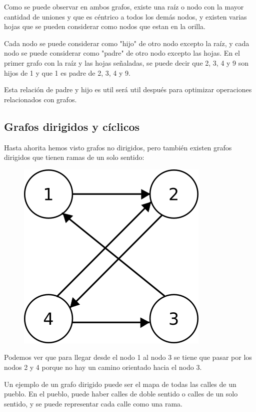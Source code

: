 \documentclass{article}
\begin{document}
Como se puede observar en ambos grafos, existe una raíz o nodo con la mayor cantidad de uniones y que es céntrico a todos los demás nodos, y existen varias hojas que se pueden considerar como nodos que estan en la orilla.

Cada nodo se puede considerar como "hijo" de otro nodo excepto la raíz, y cada nodo se puede considerar como "padre" de otro nodo excepto las hojas. En el primer grafo con la raíz y las hojas señaladas, se puede decir que 2, 3, 4 y 9 son hijos de 1 y que 1 es padre de 2, 3, 4 y 9.

Esta relación de padre y hijo es util será util después para optimizar operaciones relacionados con grafos.

\subsection{Grafos dirigidos y cíclicos}

Hasta ahorita hemos visto grafos no dirigidos, pero también existen grafos dirigidos que tienen ramas de un solo sentido:

\begin{figure}[H]
    \centering
    \includegraphics[width=0.15\paperwidth]{dirigido}
\end{figure}

Podemos ver que para llegar desde el nodo 1 al nodo 3 se tiene que pasar por los nodos 2 y 4 porque no hay un camino orientado hacia el nodo 3.

Un ejemplo de un grafo dirigido puede ser el mapa de todas las calles de un pueblo. En el pueblo, puede haber calles de doble sentido o calles de un solo sentido, y se puede representar cada calle como una rama.
\end{document}
